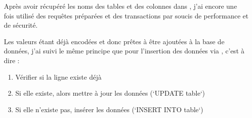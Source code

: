 Après avoir récupéré les noms des tables et des colonnes dans , j’ai encore une fois utilisé des requêtes préparées et des transactions par soucis de performance et de sécurité.

Les valeurs étant déjà encodées et donc prêtes à être ajoutées à la base de données, j’ai suivi le même principe que pour l’insertion des données via  , c’est à dire :

\begin{enumerate}
    \item Vérifier si la ligne existe déjà
    \item Si elle existe, alors mettre à jour les données (`UPDATE table`)
    \item Si elle n’existe pas, insérer les données (`INSERT INTO table`)
\end{enumerate}